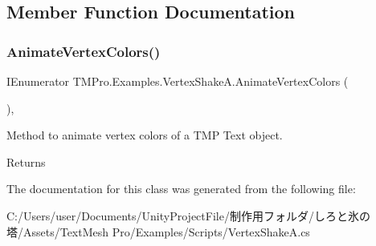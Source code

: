 \subsection{Member Function Documentation}
\mbox{\label{class_t_m_pro_1_1_examples_1_1_vertex_shake_a_a41614ab9364a34655672675eca5d16d0}} 
\subsubsection{\texorpdfstring{Animate\+Vertex\+Colors()}{AnimateVertexColors()}}
{\footnotesize\ttfamily I\+Enumerator T\+M\+Pro.\+Examples.\+Vertex\+Shake\+A.\+Animate\+Vertex\+Colors (\begin{DoxyParamCaption}{ }\end{DoxyParamCaption})\hspace{0.3cm}{\ttfamily [inline]}, {\ttfamily [private]}}



Method to animate vertex colors of a T\+MP Text object. 

\begin{DoxyReturn}{Returns}

\end{DoxyReturn}


The documentation for this class was generated from the following file\+:\begin{DoxyCompactItemize}
\item 
C\+:/\+Users/user/\+Documents/\+Unity\+Project\+File/制作用フォルダ/しろと氷の塔/\+Assets/\+Text\+Mesh Pro/\+Examples/\+Scripts/Vertex\+Shake\+A.\+cs\end{DoxyCompactItemize}
